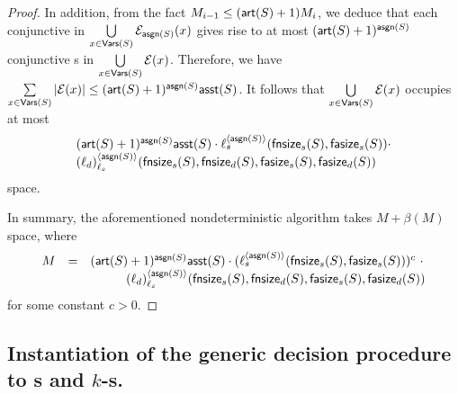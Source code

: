 \begin{proof}
In addition, from the fact $M_{i-1} \le (\mathsf{art}(S)+1)M_i $, we deduce that each conjunctive \SA{} in $\bigcup \limits_{x \in \mathsf{Vars}(S)} \mathcal{E}_{\mathsf{asgn}(S)}(x)$ gives rise to at most $(\mathsf{art}(S)+1)^{\mathsf{asgn}(S)}$ conjunctive \SA{}s in $\bigcup \limits_{x \in \mathsf{Vars}(S)} \mathcal{E}(x)$. Therefore, we have $\sum \limits_{x \in \mathsf{Vars}(S)} |\mathcal{E}(x)| \le (\mathsf{art}(S)+1)^{\mathsf{asgn}(S)} \mathsf{asst}(S)$. It follows that $\bigcup \limits_{x \in \mathsf{Vars}(S)} \mathcal{E}(x)$ occupies at most 
{\small
\[
\begin{array}{l}
(\mathsf{art}(S)+1)^{\mathsf{asgn}(S)} \mathsf{asst}(S) \cdot \ell_s^{\langle  \mathsf{asgn}(S) \rangle}(\mathsf{fnsize}_s(S), \mathsf{fasize}_s(S)) \cdot \\
  (\ell_d)^{\langle \mathsf{asgn}(S) \rangle}_{\ell_s}(\mathsf{fnsize}_s(S),  \mathsf{fnsize}_d(S), \mathsf{fasize}_s(S), \mathsf{fasize}_d(S))
\end{array}
\]
}
space. 

In summary, the aforementioned nondeterministic algorithm takes  $M + \beta(M)$ space, where 
%
$$
\begin{array}{l c l}
M & = & (\mathsf{art}(S)+1)^{\mathsf{asgn}(S)}  \mathsf{asst}(S) \cdot  (\ell_s^{\langle \mathsf{asgn}(S) \rangle}(\mathsf{fnsize}_s(S), \mathsf{fasize}_s(S)))^{c}\ \cdot \\
& &  \hspace{1cm} (\ell_d)^{\langle  \mathsf{asgn}(S) \rangle}_{\ell_s}(\mathsf{fnsize}_s(S),\mathsf{fnsize}_d(S),  \mathsf{fasize}_s(S), \mathsf{fasize}_d(S))
\end{array}
$$
%
for some constant $c > 0$.
\end{proof}


\subsection{Instantiation of the generic decision procedure to \SSPT{}s and $k$-\RBSSPT{}s.}



